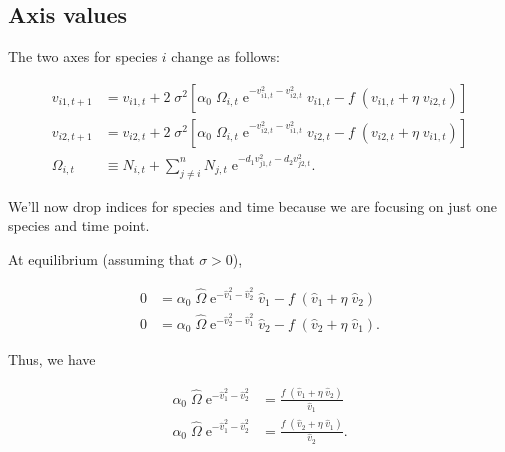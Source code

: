\subsection*{Axis values}

The two axes for species $i$ change as follows:

\begin{equation*}
\begin{split}
    v_{i1,t+1} &= v_{i1,t} + 2 \; \sigma^2
    \left[
        \alpha_0 \; \Omega_{i,t} \;
            \textrm{e}^{-v_{i1,t}^2 - v_{i2,t}^2} \; v_{i1,t}
        - f \; ( v_{i1,t} + \eta \; v_{i2,t} )
    \right] \\
    v_{i2,t+1} &= v_{i2,t} + 2 \; \sigma^2
    \left[
        \alpha_0 \; \Omega_{i,t} \;
            \textrm{e}^{-v_{i2,t}^2 - v_{i1,t}^2} \; v_{i2,t}
        - f \; ( v_{i2,t} + \eta \; v_{i1,t} )
    \right] \\
    \Omega_{i,t} &\equiv N_{i,t} +
        \sum_{j \ne i}^{n}{ N_{j,t} \; \textrm{e}^{
                - d_1 v_{j1,t}^2 - d_2 v_{j2,t}^2 } }
    \textrm{.}
\end{split}
\end{equation*}


We'll now drop indices for species and time because we are
focusing on just one species and time point.



At equilibrium (assuming that $\sigma > 0$),

\begin{equation}
\begin{split}
    0 &= \alpha_0 \; \hat{\Omega} \;
            \textrm{e}^{-\hat{v}_{1}^2 - \hat{v}_{2}^2} \; \hat{v}_{1}
        - f \; ( \hat{v}_{1} + \eta \; \hat{v}_{2} ) \\
    0 &=
        \alpha_0 \; \hat{\Omega} \;
            \textrm{e}^{-\hat{v}_{2}^2 - \hat{v}_{1}^2} \; \hat{v}_{2}
        - f \; ( \hat{v}_{2} + \eta \; \hat{v}_{1} )
    \textrm{.}
\end{split}
\label{eq:two-axes-v-eq1}
\end{equation}


\noindent Thus, we have

\begin{equation*}
\begin{split}
    \alpha_0 \; \hat{\Omega} \; \textrm{e}^{-\hat{v}_{1}^2 - \hat{v}_{2}^2} &=
        \frac{ f \; ( \hat{v}_{1} + \eta \; \hat{v}_{2} ) }{ \hat{v}_{1} } \\
    \alpha_0 \; \hat{\Omega} \; \textrm{e}^{-\hat{v}_{1}^2 - \hat{v}_{2}^2} &=
        \frac{ f \; ( \hat{v}_{2} + \eta \; \hat{v}_{1} ) }{ \hat{v}_{2} }
    \textrm{.}
\end{split}
\end{equation*}


